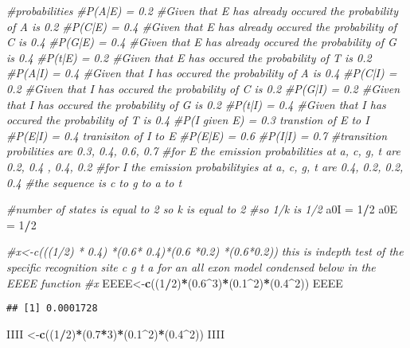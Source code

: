 \documentclass[
]{article}
\newenvironment{Shaded}{\begin{snugshade}}{\end{snugshade}}
\newcommand{\CommentTok}[1]{\textcolor[rgb]{0.56,0.35,0.01}{\textit{#1}}}
\newcommand{\DecValTok}[1]{\textcolor[rgb]{0.00,0.00,0.81}{#1}}
\newcommand{\FloatTok}[1]{\textcolor[rgb]{0.00,0.00,0.81}{#1}}
\newcommand{\KeywordTok}[1]{\textcolor[rgb]{0.13,0.29,0.53}{\textbf{#1}}}
\newcommand{\NormalTok}[1]{#1}
\newcommand{\OperatorTok}[1]{\textcolor[rgb]{0.81,0.36,0.00}{\textbf{#1}}}
\newcommand{\StringTok}[1]{\textcolor[rgb]{0.31,0.60,0.02}{#1}}
\begin{document}
\begin{Shaded}
\begin{Highlighting}[]
\CommentTok{#probabilities}
\CommentTok{#P(A|E) = 0.2 #Given that E has already occured the probability of A is 0.2}
\CommentTok{#P(C|E) = 0.4 #Given that E has already occured the probability of C is 0.4}
\CommentTok{#P(G|E) = 0.4 #Given that E has already occured the probability of G is 0.4}
\CommentTok{#P(t|E) = 0.2 #Given that E has occured the probability of T is 0.2}
\CommentTok{#P(A|I) = 0.4 #Given that I has occured the probability of A is 0.4}
\CommentTok{#P(C|I) = 0.2 #Given that I has occured the probability  of C is 0.2}
\CommentTok{#P(G|I) = 0.2 #Given that I has occured the probability of G is 0.2}
\CommentTok{#P(t|I) = 0.4 #Given that I has occured the probability of T is 0.4}
\CommentTok{#P(I given E) = 0.3 transtion of E to I}
\CommentTok{#P(E|I) = 0.4 tranisiton of I to E}
\CommentTok{#P(E|E) = 0.6}
\CommentTok{#P(I|I) = 0.7}
\CommentTok{#transition probilities are 0.3, 0.4, 0.6, 0.7}
\CommentTok{#for E the emission probabilities at a, c, g, t are 0.2, 0.4 , 0.4, 0.2}
\CommentTok{#for I the emission probabilityies at a, c, g, t are 0.4, 0.2, 0.2, 0.4}
\CommentTok{#the sequence is c to g to a to t}

\CommentTok{#number of states is equal to 2 so k is equal to 2 }
\CommentTok{#so 1/k is 1/2}
\NormalTok{a0I =}\StringTok{ }\DecValTok{1}\OperatorTok{/}\DecValTok{2}
\NormalTok{a0E =}\StringTok{ }\DecValTok{1}\OperatorTok{/}\DecValTok{2}

\CommentTok{#x<-c(((1/2) * 0.4) *(0.6* 0.4)*(0.6 *0.2) *(0.6*0.2)) this is indepth test of the specific recognition site c g t a for an all exon model condensed below in the EEEE function}
\CommentTok{#x}
\NormalTok{EEEE<-}\KeywordTok{c}\NormalTok{((}\DecValTok{1}\OperatorTok{/}\DecValTok{2}\NormalTok{)}\OperatorTok{*}\NormalTok{(}\FloatTok{0.6}\OperatorTok{^}\DecValTok{3}\NormalTok{)}\OperatorTok{*}\NormalTok{(}\FloatTok{0.1}\OperatorTok{^}\DecValTok{2}\NormalTok{)}\OperatorTok{*}\NormalTok{(}\FloatTok{0.4}\OperatorTok{^}\DecValTok{2}\NormalTok{))}
\NormalTok{EEEE}
\end{Highlighting}
\end{Shaded}

\begin{verbatim}
## [1] 0.0001728
\end{verbatim}

\begin{Shaded}
\begin{Highlighting}[]
\NormalTok{IIII <-}\KeywordTok{c}\NormalTok{((}\DecValTok{1}\OperatorTok{/}\DecValTok{2}\NormalTok{)}\OperatorTok{*}\NormalTok{(}\FloatTok{0.7}\OperatorTok{*}\DecValTok{3}\NormalTok{)}\OperatorTok{*}\NormalTok{(}\FloatTok{0.1}\OperatorTok{^}\DecValTok{2}\NormalTok{)}\OperatorTok{*}\NormalTok{(}\FloatTok{0.4}\OperatorTok{^}\DecValTok{2}\NormalTok{))}
\NormalTok{IIII}
\end{Highlighting}
\end{Shaded}
\end{document}
